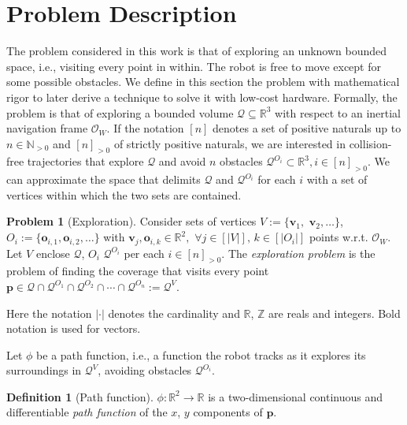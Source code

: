 \documentclass[letterpaper,10pt,conference,twoside]{IEEEtran}
\theoremstyle{definition}
\newtheorem{defn}{Definition}[section]
\newtheorem*{pb}{Problem}%
\begin{document}
\section{Problem Description}
\label{sec:pf}
\noindent
The problem considered in this work %
is that of exploring an unknown bounded space, i.e., visiting %
every point in within.
The robot is free to move except for %
some possible obstacles.
We define in this section the problem with mathematical rigor to later derive a technique to solve it %
with low-cost hardware. 
Formally, the problem 
is that of exploring a bounded volume $\mathcal{Q}\subseteq\mathbb{R}^3$ with respect to an inertial navigation frame $\mathcal{O}_W$. If the notation $[n]$ denotes a set of positive naturals up to $n\in\mathbb{N}_{>0}$ and $[n]_{>0}$ of strictly positive naturals, we are interested in collision-free trajectories that explore $\mathcal{Q}$ and avoid $n$ obstacles $\mathcal{Q}^{O_i}\subset\mathbb{R}^3,i\in[n]_{>0}$. We can approximate the space that delimits $\mathcal{Q}$ and $\mathcal{Q}^{O_i}$ for each $i$ with a set of vertices within which the two sets are contained.

\begin{pb}[Exploration]
  Consider sets of vertices $V:=\{\mathbf{v}_1,$ $\mathbf{v}_2,\dots\}$, $O_i:=\{\mathbf{o}_{i,1},\mathbf{o}_{i,2},\dots\}$ with $\mathbf{v}_j,\mathbf{o}_{i,k}\in\mathbb{R}^2,$ $\forall j\in[|V|],\,k\in[|O_i|]$ points w.r.t. $\mathcal{O}_W$. Let $V$ enclose $\mathcal{Q}$, $O_i$ $\mathcal{Q}^{O_i}$ per each $i\in[n]_{>0}$. The \textit{exploration problem} is the problem of finding the coverage that visits %
  every point $\mathbf{p}\in\mathcal{Q}\cap\mathcal{Q}^{O_1}\cap\mathcal{Q}^{O_2}\cap\cdots\cap\mathcal{Q}^{O_n}:=\mathcal{Q}^V$.
\end{pb}

Here the notation $|\cdot|$ denotes the cardinality and $\mathbb{R}$, $\mathbb{Z}$ are reals and integers. Bold notation is used for vectors.

Let $\phi$ be a path function, i.e., a function the robot tracks as it explores its surroundings in $\mathcal{Q}^V$, avoiding %
obstacles $\mathcal{Q}^{O_i}$.

\begin{defn}[Path function]\label{def:pf}
  $\phi:\mathbb{R}^2\rightarrow\mathbb{R}$ is a two-dimensional continuous and differentiable \textit{path function} of the $x$, $y$ components of $\mathbf{p}$.
\end{defn}
\end{document}

